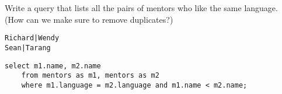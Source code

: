 \begin{blocksection}
\question Write a query that lists all the pairs of mentors who like the same language. (How can we make sure to remove duplicates?)

\begin{lstlisting}
Richard|Wendy
Sean|Tarang
\end{lstlisting}

\begin{solution}[1in]
\begin{lstlisting}
select m1.name, m2.name
    from mentors as m1, mentors as m2
    where m1.language = m2.language and m1.name < m2.name;
\end{lstlisting}
\end{solution}
\end{blocksection}
